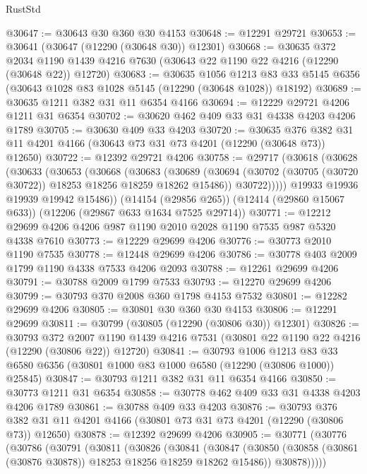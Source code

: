 \begin{lexlean}{RustStd}
\begin{coremodule}
@30647 := @30643 @30 @360 @30 @4153
@30648 := @12291 @29721
@30653 := @30641 (@30647 (@12290 (@30648 @30)) @12301)
@30668 := @30635
    @372
    @2034
    @1190
    @1439
    @4216
    @7630
    (@30643 @22 @1190 @22 @4216 (@12290 (@30648 @22)) @12720)
@30683 := @30635
    @1056
    @1213
    @83
    @33
    @5145
    @6356
    (@30643 @1028 @83 @1028 @5145 (@12290 (@30648 @1028)) @18192)
@30689 := @30635 @1211 @382 @31 @11 @6354 @4166
@30694 := @12229 @29721 @4206 @1211 @31 @6354
@30702 := @30620 @462 @409 @33 @31 @4338 @4203 @4206 @1789
@30705 := @30630 @409 @33 @4203
@30720 := @30635
    @376
    @382
    @31
    @11
    @4201
    @4166
    (@30643 @73 @31 @73 @4201 (@12290 (@30648 @73)) @12650)
@30722 := @12392 @29721 @4206
@30758 := @29717
    (@30618
      (@30628
        (@30633
          (@30653
            (@30668
              (@30683
                (@30689
                  (@30694 (@30702 (@30705 (@30720 @30722)) @18253 @18256 @18259 @18262 @15486))
                  @30722)))))
        @19933
        @19936
        @19939
        @19942
        @15486))
    (@14154 (@29856 @265))
    (@12414 (@29860 @15067 @633))
    (@12206 (@29867 @633 @1634 @7525 @29714))
@30771 := @12212 @29699 @4206 @4206 @987 @1190 @2010 @2028 @1190 @7535 @987 @5320 @4338 @7610
@30773 := @12229 @29699 @4206
@30776 := @30773 @2010 @1190 @7535
@30778 := @12448 @29699 @4206
@30786 := @30778 @403 @2009 @1799 @1190 @4338 @7533 @4206 @2093
@30788 := @12261 @29699 @4206
@30791 := @30788 @2009 @1799 @7533
@30793 := @12270 @29699 @4206
@30799 := @30793 @370 @2008 @360 @1798 @4153 @7532
@30801 := @12282 @29699 @4206
@30805 := @30801 @30 @360 @30 @4153
@30806 := @12291 @29699
@30811 := @30799 (@30805 (@12290 (@30806 @30)) @12301)
@30826 := @30793
    @372
    @2007
    @1190
    @1439
    @4216
    @7531
    (@30801 @22 @1190 @22 @4216 (@12290 (@30806 @22)) @12720)
@30841 := @30793
    @1006
    @1213
    @83
    @33
    @6580
    @6356
    (@30801 @1000 @83 @1000 @6580 (@12290 (@30806 @1000)) @25845)
@30847 := @30793 @1211 @382 @31 @11 @6354 @4166
@30850 := @30773 @1211 @31 @6354
@30858 := @30778 @462 @409 @33 @31 @4338 @4203 @4206 @1789
@30861 := @30788 @409 @33 @4203
@30876 := @30793
    @376
    @382
    @31
    @11
    @4201
    @4166
    (@30801 @73 @31 @73 @4201 (@12290 (@30806 @73)) @12650)
@30878 := @12392 @29699 @4206
@30905 := @30771
    (@30776
      (@30786
        (@30791
          (@30811
            (@30826
              (@30841
                (@30847
                  (@30850 (@30858 (@30861 (@30876 @30878)) @18253 @18256 @18259 @18262 @15486))
                  @30878)))))

\end{coremodule}
\end{lexlean}
